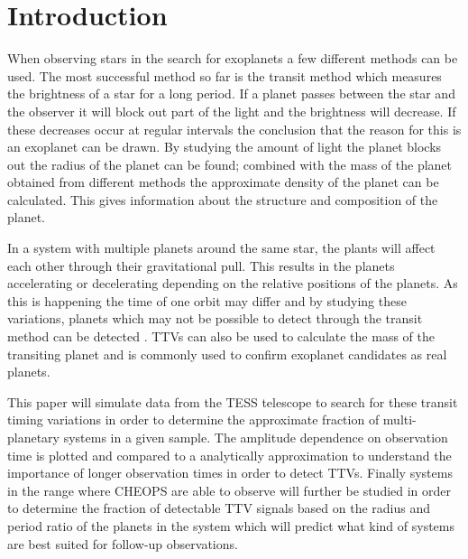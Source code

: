 \documentclass[12pt]{report}
\begin{document}
\newpage

\setcounter{page}{1} %

\tableofcontents

\newpage

\listoffigures 

\newpage

\chapter{Introduction}
When observing stars in the search for exoplanets a few different methods can be used. The most successful method so far is the transit method which measures the brightness of a star for a long period. If a planet passes between the star and the observer it will block out part of the light and the brightness will decrease. If these decreases occur at regular intervals the conclusion that the reason for this is an exoplanet can be drawn. By studying the amount of light the planet blocks out the radius of the planet can be found; combined with the mass of the planet obtained from different methods the approximate density of the planet can be calculated. This gives information about the structure and composition of the planet.

In a system with multiple planets around the same star, the plants will affect each other through their gravitational pull. This results in the planets accelerating or decelerating depending on the relative positions of the planets. As this is happening the time of one orbit may differ and by studying these variations, planets which may not be possible to detect through the transit method can be detected \citep{2012Sci...336.1133N}. TTVs can also be used to calculate the mass of the transiting planet and is commonly used to confirm exoplanet candidates as real planets.

This paper will simulate data from the TESS telescope to search for these transit timing variations in order to determine the approximate fraction of multi-planetary systems in a given sample. The amplitude dependence on observation time is plotted and compared to a analytically approximation to understand the importance of longer observation times in order to detect TTVs. Finally systems in the range where CHEOPS are able to observe will further be studied in order to determine the fraction of detectable TTV signals based on the radius and period ratio of the planets in the system which will predict what kind of systems are best suited for follow-up observations.
\end{document}

